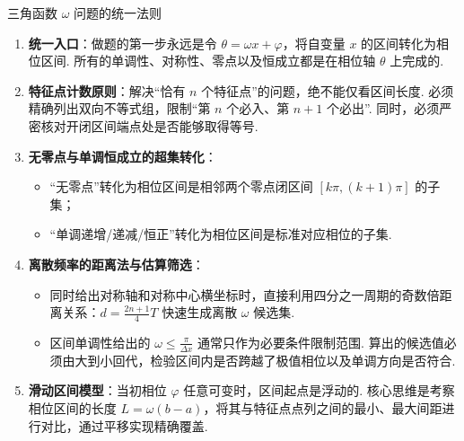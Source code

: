 \documentclass[11pt,a4paper]{ctexart}
\begin{document}
\begin{theorembox}{三角函数 $\omega$ 问题的统一法则}
  \begin{enumerate}[label=\arabic*. , leftmargin=2em, itemsep=0.5em, topsep=0.3em]
    \item \textbf{统一入口}：做题的第一步永远是令 $\theta = \omega x + \varphi$，将自变量 $x$ 的区间转化为相位区间. 所有的单调性、对称性、零点以及恒成立都是在相位轴 $\theta$ 上完成的.
    \item \textbf{特征点计数原则}：解决“恰有 $n$ 个特征点”的问题，绝不能仅看区间长度. 必须精确列出双向不等式组，限制“第 $n$ 个必入、第 $n+1$ 个必出”. 同时，必须严密核对开闭区间端点处是否能够取得等号.
    \item \textbf{无零点与单调恒成立的超集转化}：
      \begin{itemize}[itemsep=0.2em]
        \item “无零点”转化为相位区间是相邻两个零点闭区间 $[k\pi, (k+1)\pi]$ 的子集；
        \item “单调递增/递减/恒正”转化为相位区间是标准对应相位的子集.
      \end{itemize}
    \item \textbf{离散频率的距离法与估算筛选}：
      \begin{itemize}[itemsep=0.2em]
        \item 同时给出对称轴和对称中心横坐标时，直接利用四分之一周期的奇数倍距离关系：$d = \frac{2n+1}{4}T$ 快速生成离散 $\omega$ 候选集.
        \item 区间单调性给出的 $\omega \le \frac{\pi}{\Delta x}$ 通常只作为必要条件限制范围. 算出的候选值必须由大到小回代，检验区间内是否跨越了极值相位以及单调方向是否符合.
      \end{itemize}
    \item \textbf{滑动区间模型}：当初相位 $\varphi$ 任意可变时，区间起点是浮动的. 核心思维是考察相位区间的长度 $L = \omega(b-a)$，将其与特征点点列之间的最小、最大间距进行对比，通过平移实现精确覆盖.
  \end{enumerate}
\end{theorembox}
\end{document}
